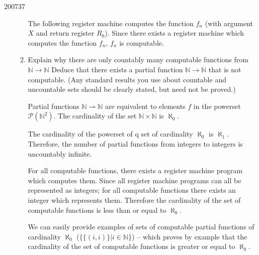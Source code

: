 \documentclass[10pt,\jkfside,a4paper]{article}
\begin{document}
\begin{examquestion}{2007}{3}{7}
\begin{enumerate}
\begin{enumerate}
The following register machine computes the function $f_n$ (with argument
$X$ and return register $R_0$). Since there exists a register machine which
computes the function $f_n$, $f_n$ is computable.

\begin{center}
\end{center}

\item Explain why there are only countably many computable functions from
$\mathbb{N} \to \mathbb{N}$ Deduce that there exists a partial function
$\mathbb{N} \to \mathbb{N}$ that is not computable. (Any standard results
you use about countable and uncountable sets should be clearly stated, but
need not be proved.)

Partial functions $\mathbb{N} \rightharpoonup \mathbb{N}$ are equivalent to
elements $f$ in the powerset $\mathcal{P}\left(\mathbb{N}^2\right)$. The
cardinality of the set $\mathbb{N}\times \mathbb{N}$ is $\aleph_0$.

The cardinality of the powerset of q set of cardinality $\aleph_0$
is $\aleph_1$. Therefore, the number of partial functions from integers to
integers is uncountably infinite.

For all computable functions, there exists a register machine program which
computes them. Since all register machine programs can all be represented as
integers; for all computable functions there exists an integer which
represents them. Therefore the cardinality of the set of computable
functions is less than or equal to $\aleph_0$.

We can easily provide examples of sets of computable partial functions of
cardinality $\aleph_0$ ($\{\{(i, i)\} | i \in \mathbb{N}\}$) -- which proves
by example that the cardinality of the set of computable functions is
greater or equal to $\aleph_0$.


\end{enumerate}
\end{enumerate}
\end{examquestion}
\end{document}
